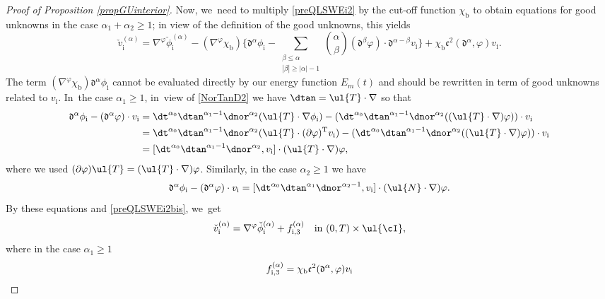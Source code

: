 \begin{proof}[Proof of Proposition \ref{propGUinterior}]
Now, we~need to multiply \eqref{preQLSWEi2} by the cut-off function $\chi_\mathrm{b}$ to obtain equations for good unknowns in the case $\alpha_1+\alpha_2\geq1$;
in view of the definition of the good unknowns, this yields
\begin{equation}\label{preQLSWEi2bis}
\check{v}_\mathrm{i}^{(\alpha)}=\nabla^\varphi \check\phi_\mathrm{i}^{(\alpha)}-(\nabla^\varphi \chi_\mathrm{b})
\biggl\{ \mathfrak{d}^{\alpha}\phi_\mathrm{i}
- \sum_{\substack{\beta\leq\alpha\\ |\beta|\geq|\alpha|-1}} \binom{\alpha}{\beta}
(\mathfrak{d}^{\beta}\varphi)\cdot\mathfrak{d}^{\alpha-\beta}v_\mathrm{i} \biggr\} + \chi_\mathrm{b}{\mathfrak c}^2(\mathfrak{d}^\alpha,\varphi)v_\mathrm{i}.
\end{equation}
The term $(\nabla^\varphi\chi_\mathrm{b})\mathfrak{d}^{\alpha}\phi_\mathrm{i}$ cannot be evaluated directly by our energy
function $E_m(t)$ and should be rewritten in term of good unknowns related to $v_\mathrm{i}$. In~the case $\alpha_1\geq1$, in~view of \eqref{NorTanD2} we have $\dtan=\ul{T}\cdot\nabla$ so that
\begin{align*}
\mathfrak{d}^{\alpha}\phi_\mathrm{i} - (\mathfrak{d}^{\alpha}\varphi)\cdot v_\mathrm{i}
&= \dt^{\alpha_0}\dtan^{\alpha_1-1}\dnor^{\alpha_2}(\ul{T}\cdot\nabla\phi_\mathrm{i})
- (\dt^{\alpha_0}\dtan^{\alpha_1-1}\dnor^{\alpha_2}((\ul{T}\cdot\nabla)\varphi))\cdot v_\mathrm{i} \\
&= \dt^{\alpha_0}\dtan^{\alpha_1-1}\dnor^{\alpha_2}(\ul{T}\cdot(\partial\varphi)^\mathrm{T}v_\mathrm{i})
- (\dt^{\alpha_0}\dtan^{\alpha_1-1}\dnor^{\alpha_2}((\ul{T}\cdot\nabla)\varphi))\cdot v_\mathrm{i} \nonumber \\
&= [\dt^{\alpha_0}\dtan^{\alpha_1-1}\dnor^{\alpha_2},v_\mathrm{i}]\cdot(\ul{T}\cdot\nabla)\varphi, \nonumber
\end{align*}
where we used $(\partial\varphi)\ul{T}=(\ul{T}\cdot\nabla)\varphi$.
Similarly, in the case $\alpha_2\geq1$ we have
\[
\mathfrak{d}^{\alpha}\phi_\mathrm{i} - (\mathfrak{d}^{\alpha}\varphi)\cdot v_\mathrm{i}
= [\dt^{\alpha_0}\dtan^{\alpha_1}\dnor^{\alpha_2-1},v_\mathrm{i}]\cdot(\ul{N}\cdot\nabla)\varphi.
\]
By these equations and \eqref{preQLSWEi2bis}, we~get
\[
\check{v}_\mathrm{i}^{(\alpha)} = \nabla^\varphi\check{\phi}_\mathrm{i}^{(\alpha)} + f_{{\rm i},3}^{(\alpha)} \quad\text{in } (0,T)\times\ul{\cI},
\]
where in the case $\alpha_1\geq1$
\begin{multline}\label{deffi3}
f_{{\rm i},3}^{(\alpha)}
= \chi_\mathrm{b} \mathfrak{c}^2(\mathfrak{d}^\alpha,\varphi)v_\mathrm{i} \\

\end{multline}
\end{proof}
